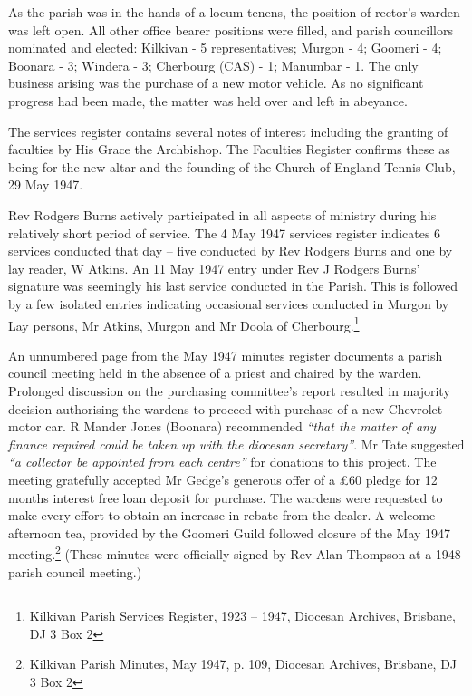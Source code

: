 As the parish was in the hands of a locum tenens, the position of rector's warden was left open. All other office bearer positions were filled, and parish councillors nominated and elected: Kilkivan - 5 representatives; Murgon - 4; Goomeri - 4; Boonara - 3; Windera - 3; Cherbourg (CAS) - 1; Manumbar - 1. The only business arising was the purchase of a new motor vehicle. As no significant progress had been made, the matter was held over and left in abeyance.



The services register contains several notes of interest including the granting of faculties by His Grace the Archbishop. The Faculties Register confirms these as being for the new altar and the founding of the Church of England Tennis Club, 29 May 1947.



Rev Rodgers Burns actively participated in all aspects of ministry during his relatively short period of service. The 4 May 1947 services register indicates 6 services conducted that day -- five conducted by Rev Rodgers Burns and one by lay reader, W Atkins. An 11 May 1947 entry under Rev J Rodgers Burns' signature was seemingly his last service conducted in the Parish. This is followed by a few isolated entries indicating occasional services conducted in Murgon by Lay persons, Mr Atkins, Murgon and Mr Doola of Cherbourg.\footnote{Kilkivan Parish Services Register, 1923 -- 1947, Diocesan Archives, Brisbane, DJ 3 Box 2}


An unnumbered page from the May 1947 minutes register documents a parish council meeting held in the absence of a priest and chaired by the warden. Prolonged discussion on the purchasing committee's report resulted in majority decision authorising the wardens to proceed with purchase of a new Chevrolet motor car. R Mander Jones (Boonara) recommended \emph{``that the matter of any finance required could be taken up with the diocesan secretary''}. Mr Tate suggested \emph{``a collector be appointed from each centre''} for donations to this project. The meeting gratefully accepted Mr Gedge's generous offer of a \pounds60 pledge for 12 months interest free loan deposit for purchase. The wardens were requested to make every effort to obtain an increase in rebate from the dealer. A welcome afternoon tea, provided by the Goomeri Guild followed closure of the May 1947 meeting.\footnote{Kilkivan Parish Minutes, May 1947, p. 109, Diocesan Archives, Brisbane, DJ 3 Box 2} (These minutes were officially signed by Rev Alan Thompson at a 1948 parish council meeting.)


